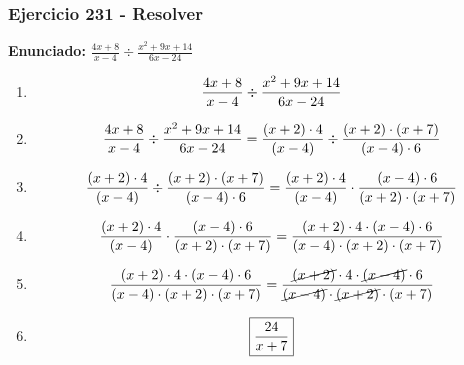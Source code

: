 \documentclass[11pt,a4paper]{article}
\newcommand{\fitmath}[1]{%
\[
\setbox0=\hbox{$\displaystyle #1$}%
\ifdim\wd0>\linewidth
\resizebox{\linewidth}{!}{$\displaystyle #1$}%
\else
#1%
\fi
\]
}
\begin{document}
\subsubsection*{Ejercicio 231 - Resolver}
\textbf{Enunciado:} $ \frac{4 x + 8}{x - 4} \div \frac{x^{2} + 9 x + 14}{6 x - 24} $\par
\begin{enumerate}[leftmargin=2em]
\item \fitmath{\frac{4 x + 8}{x - 4} \div \frac{x^{2} + 9 x + 14}{6 x - 24}}
\item \fitmath{\frac{4 x + 8}{x - 4} \div \frac{x^{2} + 9 x + 14}{6 x - 24}= \frac{\left(x + 2\right)\cdot 4}{\left(x - 4\right)} \div \frac{\left(x + 2\right)\cdot \left(x + 7\right)}{\left(x - 4\right)\cdot 6}}
\item \fitmath{\frac{\left(x + 2\right)\cdot 4}{\left(x - 4\right)}\div \frac{\left(x + 2\right)\cdot \left(x + 7\right)}{\left(x - 4\right)\cdot 6}= \frac{\left(x + 2\right)\cdot 4}{\left(x - 4\right)}\cdot \frac{\left(x - 4\right)\cdot 6}{\left(x + 2\right)\cdot \left(x + 7\right)}}
\item \fitmath{\frac{\left(x + 2\right)\cdot 4}{\left(x - 4\right)}\cdot \frac{\left(x - 4\right)\cdot 6}{\left(x + 2\right)\cdot \left(x + 7\right)}= \frac{\left(x + 2\right)\cdot 4\cdot \left(x - 4\right)\cdot 6}{\left(x - 4\right)\cdot \left(x + 2\right)\cdot \left(x + 7\right)}}
\item \fitmath{\frac{\left(x + 2\right)\cdot 4\cdot \left(x - 4\right)\cdot 6}{\left(x - 4\right)\cdot \left(x + 2\right)\cdot \left(x + 7\right)}= \frac{\cancel{\left(x + 2\right)}\cdot 4\cdot \cancel{\left(x - 4\right)}\cdot 6}{\cancel{\left(x - 4\right)}\cdot \cancel{\left(x + 2\right)}\cdot \left(x + 7\right)}}
\item \fitmath{\boxed{\frac{24}{x + 7}}}
\end{enumerate}

\vspace{0.12cm}
\end{document}
